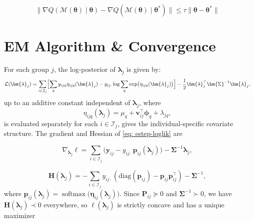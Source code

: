 \begin{condition}
    \begin{equation}
        \| \nabla Q(\mathcal{M}(\bm{\theta})\mid \bm{\theta})-\nabla Q(\mathcal{M}(\bm{\theta})\mid \bm{\theta}^{*})\|\leq \tau \|\bm{\theta}-\bm{\theta}^{*}\|
    \end{equation}
\end{condition}

\fi

\section{EM Algorithm \& Convergence}
\label{sec: EM}
    For each group $j$, the log-posterior of $\bm{\lambda}_{j}$ is given by:
\begin{equation}
    \mathcal{L}(\bm{\lambda}_{j})=\sum_{i\in \mathcal{I}_{j}}\Bigl[\sum_{q}y_{ijq}\eta_{ijq}(\bm{\lambda}_{j})-y_{ij\cdot}\log \sum_{q}\exp\bigl(\eta_{ijq}(\bm{\lambda}_{j})\bigr)\Bigr]-\frac{1}{2}\bm{\lambda}_{j}^{\top}\bm{\Sigma}^{-1}\bm{\lambda}_{j},
    \label{eq: estep-loglik}
\end{equation}
up to an additive constant independent of $\bm{\lambda}_{j}$, where 
\begin{equation}
    \eta_{ijq}(\bm{\lambda}_{j})=\mu_{q}+\bm{v}_{ij}^{\top}\bm{\phi}_{q}+\lambda_{jq},
    \label{eq: individualcovariate}
\end{equation}
is evaluated separately for each $i\in \mathcal{I}_{j}$, gives the individual-specific covariate structure.
The gradient and Hessian of \eqref{eq: estep-loglik} are

\begin{equation}
    \nabla_{\bm{\lambda}_{j}}\ell=\sum_{i\in \mathcal{I}_{j}}\bigl(\bm{y}_{ij}-y_{ij\cdot}\bm{p}_{ij}(\bm{\lambda}_{j})\bigr)-\bm{\Sigma}^{-1}\bm{\lambda}_{j},
\end{equation}

\begin{equation}
    \mathbf{H}(\bm{\lambda}_{j})=-\sum_{i\in\mathcal{I}_{j}}y_{ij\cdot}\left(\text{diag}(\bm{p}_{ij})-\bm{p}_{ij}\bm{p}_{ij}^{\top}\right)-\bm{\Sigma}^{-1},
    \label{eq: hessian-equality}
\end{equation}
where $\bm{p}_{ij}(\bm{\lambda}_{j})=\operatorname{softmax}\bigl(\bm{\eta}_{ij}(\bm{\lambda}_{j})\bigr)$. Since $\mathbf{P}_{ij}\succeq 0$ and $\bm{\Sigma}^{-1}\succ 0$, we have $\mathbf{H}(\bm{\lambda}_{j})\prec 0$ everywhere, so $\ell(\bm{\lambda}_{j})$ is strictly concave and has a unique maximizer

